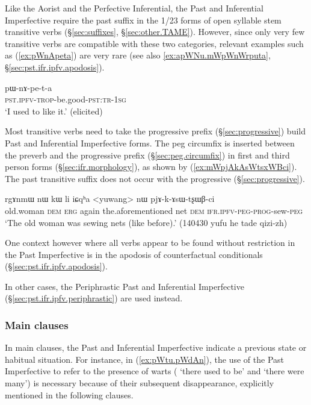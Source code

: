 Like the Aorist and the Perfective Inferential, the Past and Inferential Imperfective require the past suffix  in the 1/2\fl{}3 forms of open syllable stem transitive verbs (§\ref{sec:suffixes}, §\ref{sec:other.TAME}). However, since only very few transitive verbs are compatible with these two categories, relevant examples such as (\ref{ex:pWnApeta}) are very rare (see also \ref{ex:apWNu.mWpWnWrputa}, §\ref{sec:pst.ifr.ipfv.apodosis}).

\begin{exe}
\ex \label{ex:pWnApeta}
\gll pɯ-nɤ-pe-t-a \\
\textsc{pst}.\textsc{ipfv}-\textsc{trop}-be.good-\textsc{pst}:\textsc{tr}-\textsc{1sg} \\
\glt `I used to like it.' (elicited)
\end{exe}


Most transitive verbs need to take the progressive  prefix (§\ref{sec:progressive}) build Past and Inferential Imperfective forms. The peg circumfix  is inserted between the  preverb and the progressive prefix (§\ref{sec:peg.circumfix}) in first and third person forms (§\ref{sec:ifr.morphology}), as shown by (\ref{ex:mWpjAkAsWtsxWBci}). The past transitive suffix  does not occur with the progressive (§\ref{sec:progressive}).

\begin{exe}
\ex \label{ex:mWpjAkAsWtsxWBci}
\gll  rgɤnmɯ nɯ kɯ li iɕqʰa <yuwang> nɯ pjɤ-k-ɤsɯ-tʂɯβ-ci \\
old.woman \textsc{dem} \textsc{erg} again the.aforementioned net \textsc{dem} \textsc{ifr}.\textsc{ipfv}-\textsc{peg}-\textsc{prog}-sew-\textsc{peg} \\
\glt `The old woman was sewing nets (like before).' (140430 yufu he tade qizi-zh)
\end{exe}

One context however where all verbs appear to be found without restriction in the Past Imperfective is in the apodosis of counterfactual conditionals (§\ref{sec:pst.ifr.ipfv.apodosis}).

In other cases, the Periphrastic Past and Inferential Imperfective (§\ref{sec:pst.ifr.ipfv.periphrastic}) are used instead.
 
\subsubsection{Main clauses} \label{sec:pst.ifr.ipfv.main}
In main clauses, the Past and Inferential Imperfective indicate a previous state or habitual situation. For instance, in (\ref{ex:pWtu.pWdAn}), the use of the Past Imperfective to refer to the presence of warts ( `there used to be' and  `there were many') is necessary because of their subsequent disappearance, explicitly mentioned in the following clauses.

